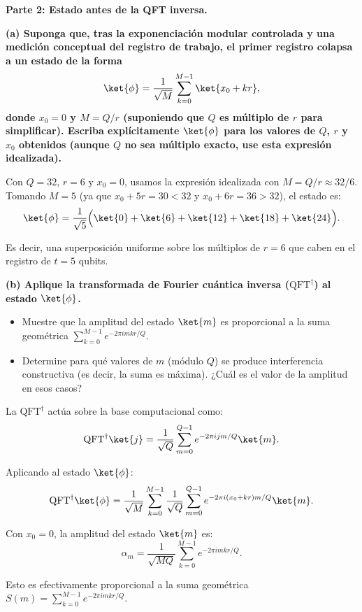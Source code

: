 \vspace{0.5cm}

{\bfseries Parte 2: Estado antes de la QFT inversa.}

{\bfseries (a) Suponga que, tras la exponenciación modular controlada y una medición conceptual del registro de trabajo, el primer registro colapsa a un estado de la forma
    $$
        \ket{\phi} = \frac{1}{\sqrt{M}} \sum_{k=0}^{M-1} \ket{x_0 + kr},
    $$
    donde $x_0 = 0$ y $M = Q/r$ (suponiendo que $Q$ es múltiplo de $r$ para simplificar). Escriba explícitamente $\ket{\phi}$ para los valores de $Q$, $r$ y $x_0$ obtenidos (aunque $Q$ no sea múltiplo exacto, use esta expresión idealizada).}

Con $Q = 32$, $r = 6$ y $x_0 = 0$, usamos la expresión idealizada con $M = Q/r \approx 32/6$. Tomando $M = 5$ (ya que $x_0 + 5r = 30 < 32$ y $x_0 + 6r = 36 > 32$), el estado es:
$$
    \ket{\phi} = \frac{1}{\sqrt{5}}\Big(\ket{0} + \ket{6} + \ket{12} + \ket{18} + \ket{24}\Big).
$$

Es decir, una superposición uniforme sobre los múltiplos de $r = 6$ que caben en el registro de $t = 5$ qubits.

\vspace{0.5cm}

{\bfseries (b) Aplique la transformada de Fourier cuántica inversa ($\text{QFT}^\dagger$) al estado $\ket{\phi}$.
    \begin{itemize}
        \item Muestre que la amplitud del estado $\ket{m}$ es proporcional a la suma geométrica $\sum_{k=0}^{M-1} e^{-2\pi i m k r / Q}$.
        \item Determine para qué valores de $m$ (módulo $Q$) se produce interferencia constructiva (es decir, la suma es máxima). ¿Cuál es el valor de la amplitud en esos casos?
    \end{itemize}
}

La $\text{QFT}^\dagger$ actúa sobre la base computacional como:
$$
    \text{QFT}^\dagger \ket{j} = \frac{1}{\sqrt{Q}} \sum_{m=0}^{Q-1} e^{-2\pi i j m / Q} \ket{m}.
$$

Aplicando al estado $\ket{\phi}$:
$$
    \text{QFT}^\dagger \ket{\phi} = \frac{1}{\sqrt{M}} \sum_{k=0}^{M-1} \frac{1}{\sqrt{Q}} \sum_{m=0}^{Q-1} e^{-2\pi i (x_0 + kr) m / Q} \ket{m}.
$$

Con $x_0 = 0$, la amplitud del estado $\ket{m}$ es:
$$
    \alpha_m = \frac{1}{\sqrt{MQ}} \sum_{k=0}^{M-1} e^{-2\pi i m k r / Q}.
$$

Esto es efectivamente proporcional a la suma geométrica $S(m) = \sum_{k=0}^{M-1} e^{-2\pi i m k r / Q}$.

